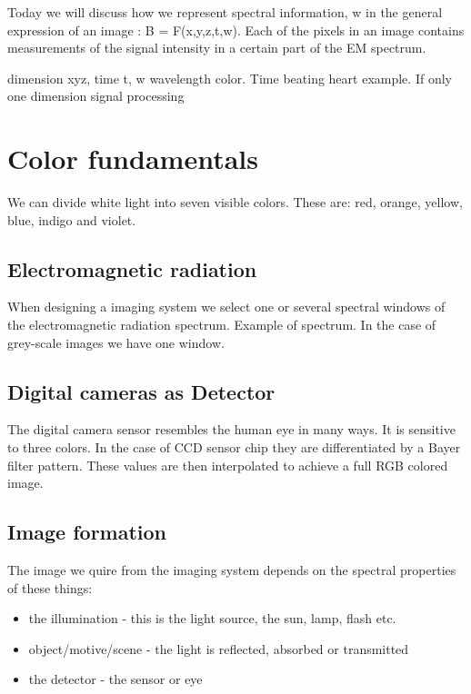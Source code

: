 Today we will discuss how we represent spectral information, w in the general expression of an image : B = F(x,y,z,t,w). Each of the pixels in an image contains measurements of the signal intensity in a certain part of the EM spectrum. 

\begin{wbox}{}
dimension xyz, time t, w wavelength color. Time beating heart example. If only one dimension signal processing
\end{wbox}


\section*{Color fundamentals}
We can divide white light into seven visible colors. These are: red, orange, yellow, blue, indigo and violet. 

\subsection*{Electromagnetic radiation}
When designing a imaging system we select one or several spectral windows of the electromagnetic radiation spectrum. Example of spectrum. In the case of grey-scale images we have one window. 

\subsection*{Digital cameras as Detector}
The digital camera sensor resembles the human eye in many ways. It is sensitive to three colors. In the case of CCD sensor chip they are differentiated by a Bayer filter pattern. These values are then interpolated to achieve a full RGB colored image. 


\subsection*{Image formation}
The image we quire from the imaging system depends on the spectral properties of these things:
\begin{itemize}
	\item the illumination \quad - this is the light source, the sun, lamp, flash etc.
	\item object/motive/scene \quad - the light is reflected, absorbed or transmitted 
	\item the detector \quad - the sensor or eye
\end{itemize}

